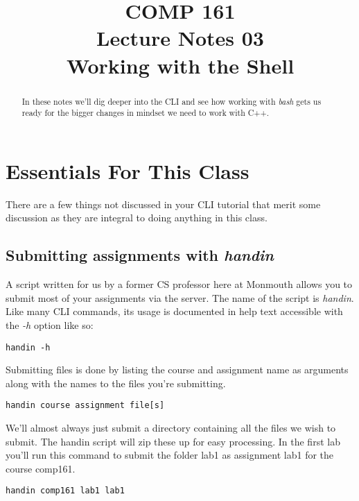 \documentclass[nobib]{tufte-handout}
\title{COMP 161 \\ Lecture Notes 03 \\ Working with the Shell}
\begin{document}
\maketitle

\begin{abstract}
In these notes we'll dig deeper into the CLI and see how working with \textit{bash} gets us ready for the bigger changes in mindset we need to work with C++.
\end{abstract}

\section{Essentials For This Class}

There are a few things not discussed in your CLI tutorial that merit some discussion as they are integral to doing anything in this class.

\subsection{Submitting assignments with \textit{handin}}

A script written for us by a former CS professor here at Monmouth allows you to submit most of your assignments via the server. The name of the script is \textit{handin}.  Like many CLI commands, its usage is documented in help text accessible with the \textit{-h} option like so:

\begin{verbatim}
handin -h
\end{verbatim}

Submitting files is done by listing the course and assignment name as arguments along with the names to the files you're submitting.

\begin{verbatim}
handin course assignment file[s]
\end{verbatim}

We'll almost always just submit a directory containing all the files we wish to submit. The handin script will zip these up for easy processing. In the first lab you'll run this command to submit the folder lab1 as assignment lab1 for the course comp161.

\begin{verbatim}
handin comp161 lab1 lab1
\end{verbatim}
\end{document}

